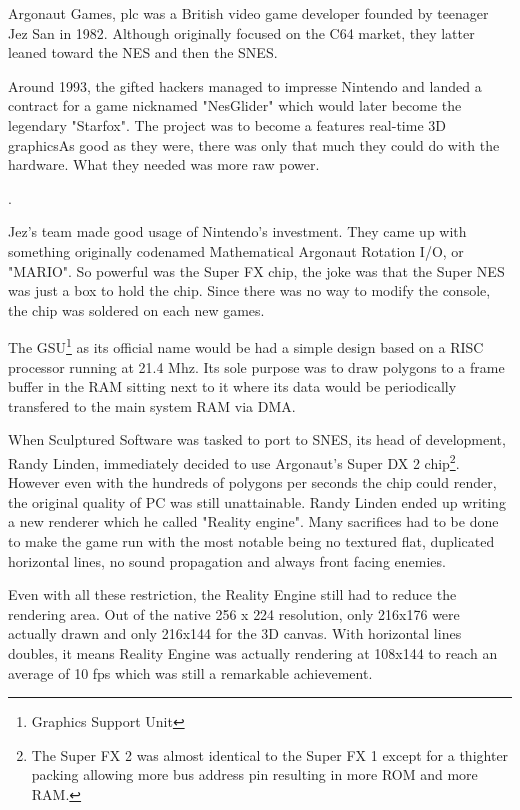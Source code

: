 Argonaut Games, plc was a British video game developer founded by teenager Jez San in 1982. Although originally focused on the C64 market, they latter leaned toward the NES and then the SNES.\\
\par Around 1993, the gifted hackers managed to impresse Nintendo and landed a contract for a game nicknamed "NesGlider" which would later become the legendary "Starfox". The project was to become a features real-time 3D graphicsAs good as they were, there was only that much they could do with the hardware. What they needed was more raw power.\\
\par
{}.\\
\par
Jez's team made good usage of Nintendo's investment. They came up with something originally codenamed Mathematical Argonaut Rotation I/O, or "MARIO". So powerful was the Super FX chip, the joke was that the Super NES was just a box to hold the chip. Since there was no way to modify the console, the chip was soldered on each new games.\\
\par
The GSU\footnote{Graphics Support Unit} as its official name would be had a simple design based on a RISC processor running at 21.4 Mhz. Its sole purpose was to draw polygons to a frame buffer in the RAM sitting next to it where its data would be periodically transfered to the main system RAM via DMA.\\
\par
{}
\par
When Sculptured Software was tasked to port \doom to SNES, its head of development, Randy Linden, immediately decided to use Argonaut's Super DX 2 chip\footnote{The Super FX 2 was almost identical to the Super FX 1 except for a thighter packing allowing more bus address pin resulting in more ROM and more RAM.}. However even with the hundreds of polygons per seconds the chip could render, the original quality of PC \doom was still unattainable. Randy Linden ended up writing a new renderer which he called "Reality engine". Many sacrifices had to be done to make the game run with the most notable being no textured flat, duplicated horizontal lines, no sound propagation and always front facing enemies.\\
\par Even with all these restriction, the Reality Engine still had to reduce the rendering area. Out of the native 256 x 224 resolution, only 216x176 were actually drawn and only 216x144 for the 3D canvas. With horizontal lines doubles, it means Reality Engine was actually rendering at 108x144 to reach an average of 10 fps which was still a remarkable achievement. 

